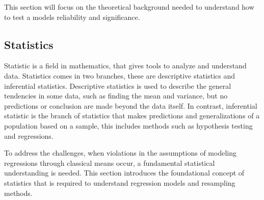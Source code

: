 This section will focus on the theoretical background needed to understand how to test a models reliability and significance. 

\subsection{Statistics}

Statistic is a field in mathematics, that gives tools to analyze and understand data. Statistics comes in two branches, these are descriptive statistics and inferential statistics. Descriptive statistics is used to describe the general tendencies in some data, such as finding the mean and variance, but no predictions or conclusion are made beyond the data itself. In contrast, inferential statistic is the branch of statistics that makes predictions and generalizations of a population based on a sample, this includes methods such as hypothesis testing and regressions. 

To address the challenges, when violations in the assumptions of modeling regressions through classical means occur, a fundamental statistical understanding is needed. This section introduces the foundational concept of statistics that is required to understand regression models and resampling methods.






\newpage

